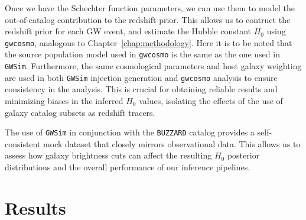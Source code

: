 Once we have the Schechter function parameters, we can use them to model the out-of-catalog contribution to the redshift prior. This allows us to contruct the redshift prior for each \ac{GW} event, and estimate the Hubble constant $H_0$ using \texttt{gwcosmo}, analogous to Chapter~\ref{chap:methodology}. Here it is to be noted that the source population model used in \texttt{gwcosmo} is the same as the one used in \texttt{GWSim}. Furthermore, the same cosmological parameters and host galaxy weighting are used in both \texttt{GWSim} injection generation and \texttt{gwcosmo} analysis to ensure consistency in the analysis. This is crucial for obtaining reliable results and minimizing biases in the inferred $H_0$ values, isolating the effects of the use of galaxy catalog subsets as redshift tracers.

The use of \texttt{\texttt{GWSim}} in conjunction with the \texttt{BUZZARD} catalog provides a self-consistent mock dataset that closely mirrors observational data. This allows us to assess how galaxy brightness cuts can affect the resulting $H_0$ posterior distributions and the overall performance of our inference pipelines.

\section{Results}
